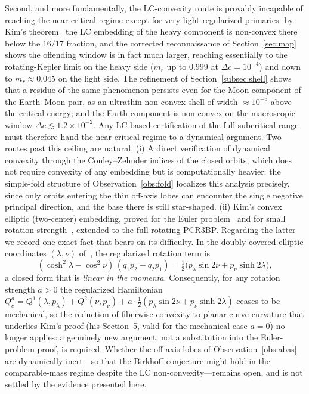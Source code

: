 \documentclass[11pt,reqno]{amsart}
\theoremstyle{plain}
\theoremstyle{definition}
\begin{document}
Second, and more fundamentally, the LC-convexity route is provably incapable of reaching the near-critical regime except for very light regularized primaries: by Kim's theorem~\cite[Thm.~1.3]{Kim} the LC embedding of the heavy component is non-convex there below the $16/17$ fraction, and the corrected reconnaissance of Section~\ref{sec:map} shows the offending window is in fact much larger, reaching essentially to the rotating-Kepler limit on the heavy side ($m_r$ up to $0.999$ at $\Delta c=10^{-4}$) and down to $m_r\approx 0.045$ on the light side. The refinement of Section~\ref{subsec:shell} shows that a residue of the same phenomenon persists even for the Moon component of the Earth--Moon pair, as an ultrathin non-convex shell of width $\approx 10^{-5}$ above the critical energy; and the Earth component is non-convex on the macroscopic window $\Delta c\lesssim 1.2\times 10^{-2}$. Any LC-based certification of the full subcritical range must therefore hand the near-critical regime to a dynamical argument. Two routes past this ceiling are natural. (i) A direct verification of dynamical convexity through the Conley--Zehnder indices of the closed orbits, which does not require convexity of any embedding but is computationally heavier; the simple-fold structure of Observation~\ref{obs:fold} localizes this analysis precisely, since only orbits entering the thin off-axis lobes can encounter the single negative principal direction, and the base there is still star-shaped. (ii) Kim's convex elliptic (two-center) embedding, proved for the Euler problem~\cite[Thm.~1.1]{Kim} and for small rotation strength~\cite[Rmk.~1.2]{Kim}, extended to the full rotating PCR3BP. Regarding the latter we record one exact fact that bears on its difficulty. In the doubly-covered elliptic coordinates $(\lambda,\nu)$ of~\cite{Kim}, the regularized rotation term is
\begin{equation}\label{eq:rotation}
(\cosh^2\lambda-\cos^2\nu)\,(q_1 p_2 - q_2 p_1) = \tfrac12\bigl(p_\lambda\sin 2\nu + p_\nu\sinh 2\lambda\bigr),
\end{equation}
a closed form that is \emph{linear in the momenta}. Consequently, for any rotation strength $a>0$ the regularized Hamiltonian $Q_c^a = Q^1(\lambda,p_\lambda) + Q^2(\nu,p_\nu) + a\cdot\tfrac12(p_\lambda\sin 2\nu + p_\nu\sinh 2\lambda)$ ceases to be mechanical, so the reduction of fiberwise convexity to planar-curve curvature that underlies Kim's proof (his Section~5, valid for the mechanical case $a=0$) no longer applies: a genuinely new argument, not a substitution into the Euler-problem proof, is required. Whether the off-axis lobes of Observation~\ref{obs:abas} are dynamically inert---so that the Birkhoff conjecture might hold in the comparable-mass regime despite the LC non-convexity---remains open, and is not settled by the evidence presented here.
\end{document}
